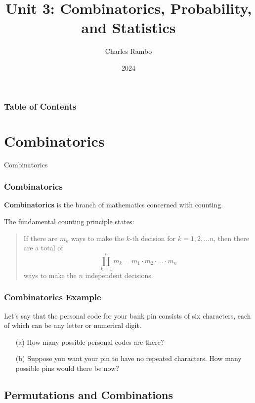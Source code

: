 \documentclass{beamer}
\title{Unit 3: Combinatorics, Probability, and Statistics}
\author{Charles Rambo}
\institute{UCLA Anderson}
\date{2024}
\begin{document}



\frame{\titlepage}

\begin{frame}[allowframebreaks]

\frametitle{Table of Contents}
\tableofcontents
\end{frame}


\section{Combinatorics}

\begin{frame}
\begin{center}
\Huge Combinatorics
\end{center}
\end{frame}


\begin{frame}

\frametitle{Combinatorics}
\begin{Definition}
{\bf Combinatorics} is the branch of mathematics concerned with counting.
\end{Definition}
The fundamental counting principle states:
\begin{quote}
If there are $m_k$ ways to make the $k$-th decision for $k = 1, 2,\ldots n$, then there are a total of 
$$
\prod_{k = 1}^n m_k = m_1\cdot m_2\cdot\ldots\cdot m_n
$$ 
ways to make the $n$ independent decisions. 
\end{quote}
\end{frame}

\begin{frame}[t]
\frametitle{Combinatorics Example}
\small
\begin{Example}
Let's say that the personal code for your bank pin consists of six characters, each of which can be any letter or numerical digit.
\begin{enumerate}
\item[(a)] How many possible personal codes are there?
\item[(b)] Suppose you want your pin to have no repeated characters. How many possible pins would there be now?
\end{enumerate}
\end{Example}
\end{frame}

\subsection{Permutations and Combinations}
\end{document}
